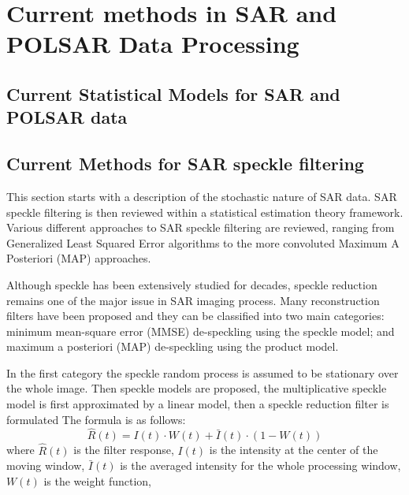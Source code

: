 \section{Current methods in SAR and POLSAR Data Processing}

\subsection{Current Statistical Models for SAR and POLSAR data}

\subsection{Current Methods for SAR speckle filtering}
This section starts with a description of the stochastic nature of SAR data. 
SAR speckle filtering is then reviewed within a statistical estimation theory framework. 
Various different approaches to SAR speckle filtering are reviewed, 
	ranging from Generalized Least Squared Error algorithms
	to the more convoluted Maximum A Posteriori (MAP) approaches.

Although speckle has been extensively studied for decades, speckle reduction remains one of the major issue in SAR imaging process. 
Many reconstruction filters have been proposed and they can be classified into two main categories: 
	minimum mean-square error (MMSE) de-speckling using the speckle model; 
	and maximum a posteriori (MAP) de-speckling using the product model. 

In the first category the speckle random process is assumed to be stationary over the whole image. 
Then speckle models are proposed, the multiplicative speckle model is first approximated by a linear model, then a speckle reduction filter is formulated
The formula is as follows: 
\begin{equation}
\hat{R}(t) = I(t) \cdot W(t) + \bar{I}(t) \cdot (1 - W(t)) 
\end{equation}
where
	$\hat{R}(t)$ is the filter response,
	$I(t)$ is the intensity at the center of the moving window,
	$\bar{I}(t)$ is the averaged intensity for the whole processing window,
	$W(t)$ is the weight function,

